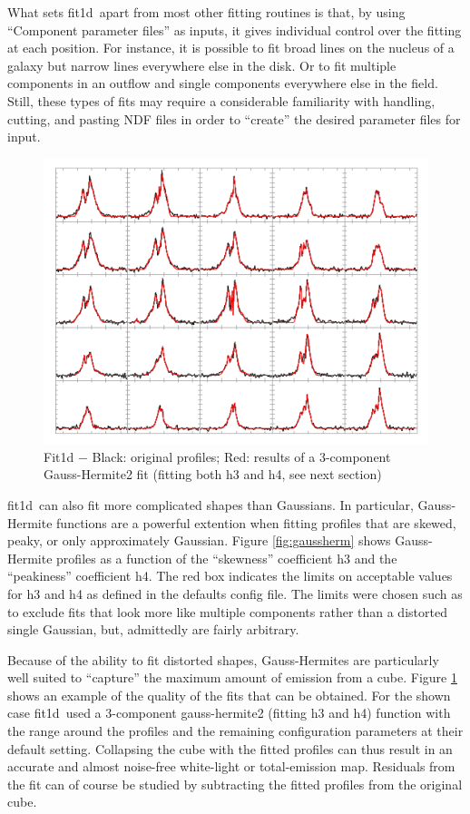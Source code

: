 \documentclass[twoside,11pt]{article}
\newcommand{\xref}[3]{#1}
\renewcommand{\_}{\texttt{\symbol{95}}}
\newcommand{\task}[1]{\textsf{#1}}
\newcommand{\fitdd}{\xref{\task{fit1d}}{sun258}{FIT1D}}
\begin{document}
What sets \fitdd\ apart from most other fitting routines is that, by
using ``Component parameter files'' as inputs, it gives individual
control over the fitting at each position. For instance, it is
possible to fit broad lines on the nucleus of a galaxy but narrow
lines everywhere else in the disk. Or to fit multiple components in an
outflow and single components everywhere else in the field. Still,
these types of fits may require a considerable familiarity with
handling, cutting, and pasting NDF files in order to ``create'' the
desired parameter files for input.

\begin{figure}[htb]
  \begin{center}
    \includegraphics[width=0.8\linewidth]{sun258_fit1d_fits}
    \caption{Fit1d $-$ Black: original profiles; Red: results of a
    3-component Gauss-Hermite2 fit (fitting both h3 and h4, see next section)}
    \label{fig:samplefits}
  \end{center}
\end{figure}

\fitdd\ can also fit more complicated shapes than Gaussians. In
particular, Gauss-Hermite functions are a powerful extention when
fitting profiles that are skewed, peaky, or only approximately
Gaussian. Figure \ref{fig:gaussherm} shows Gauss-Hermite profiles as a
function of the ``skewness'' coefficient h3 and the ``peakiness''
coefficient h4. The red box indicates the limits on acceptable values
for h3 and h4 as defined in the defaults config file. The limits were
chosen such as to exclude fits that look more like multiple components
rather than a distorted single Gaussian, but, admittedly are fairly
arbitrary.

Because of the ability to fit distorted shapes, Gauss-Hermites are
particularly well suited to ``capture'' the maximum amount of emission
from a cube. Figure \ref{fig:samplefits} shows an example of the
quality of the fits that can be obtained. For the shown case \fitdd\
used a 3-component gauss-hermite2 (fitting h3 and h4) function with
the range around the profiles and the remaining configuration
parameters at their default setting.  Collapsing the cube with the
fitted profiles can thus result in an accurate and almost noise-free
white-light or total-emission map. Residuals from the fit can of
course be studied by subtracting the fitted profiles from the original
cube.
\end{document}
